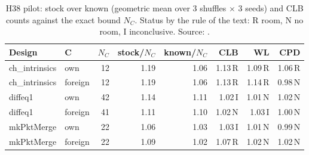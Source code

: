 \begin{table}[t]
\caption{H38 pilot: stock over known (geometric mean over 3 shuffles $\times$ 3 seeds) and CLB counts against the exact bound $N_C$. Status by the rule of the text: R room, N no room, I inconclusive. Source: .}
\label{tab:r9pilot}
\centering
\footnotesize\setlength{\tabcolsep}{3pt}
\begin{tabular}{@{}llrrrrrr@{}}
\toprule
Design & C & $N_C$ & stock/$N_C$ & known/$N_C$ & CLB & WL & CPD \\
\midrule
ch\_intrinsics & own & 12 & 1.19 & 1.06 & 1.13\,R & 1.09\,R & 1.06\,R \\
ch\_intrinsics & foreign & 12 & 1.19 & 1.06 & 1.13\,R & 1.14\,R & 0.98\,N \\
diffeq1 & own & 42 & 1.14 & 1.11 & 1.02\,I & 1.01\,N & 1.02\,N \\
diffeq1 & foreign & 41 & 1.11 & 1.10 & 1.02\,N & 1.03\,I & 1.00\,N \\
mkPktMerge & own & 22 & 1.06 & 1.03 & 1.03\,I & 1.01\,N & 0.99\,N \\
mkPktMerge & foreign & 22 & 1.09 & 1.02 & 1.07\,R & 1.02\,N & 1.02\,N \\
\bottomrule
\end{tabular}
\end{table}

